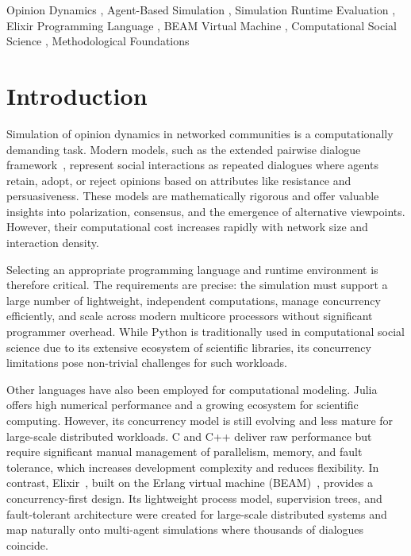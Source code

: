 \documentclass[
]{ceurart}
\begin{document}
\begin{keywords}
Opinion Dynamics \sep{} 
Agent-Based Simulation \sep{}
Simulation Runtime Evaluation \sep{} 
Elixir Programming Language \sep{} 
BEAM Virtual Machine \sep{} 
Computational Social Science \sep{} 
Methodological Foundations
\end{keywords}

\maketitle

\section{Introduction}
Simulation of opinion dynamics in networked communities is a computationally demanding task. Modern models, such as the extended pairwise dialogue framework~\cite{Lytvynenko2025}, represent social interactions as repeated dialogues where agents retain, adopt, or reject opinions based on attributes like resistance and persuasiveness. These models are mathematically rigorous and offer valuable insights into polarization, consensus, and the emergence of alternative viewpoints. However, their computational cost increases rapidly with network size and interaction density.

Selecting an appropriate programming language and runtime environment is therefore critical. The requirements are precise: the simulation must support a large number of lightweight, independent computations, manage concurrency efficiently, and scale across modern multicore processors without significant programmer overhead. While Python is traditionally used in computational social science due to its extensive ecosystem of scientific libraries, its concurrency limitations pose non-trivial challenges for such workloads.

Other languages have also been employed for computational modeling. Julia~\cite{Julia2025} offers high numerical performance and a growing ecosystem for scientific computing. However, its concurrency model is still evolving and less mature for large-scale distributed workloads. C and C++ deliver raw performance but require significant manual management of parallelism, memory, and fault tolerance, which increases development complexity and reduces flexibility. In contrast, Elixir~\cite{Elixir2025}, built on the Erlang virtual machine (BEAM)~\cite{Erlang2025}, provides a concurrency-first design. Its lightweight process model, supervision trees, and fault-tolerant architecture were created for large-scale distributed systems and map naturally onto multi-agent simulations where thousands of dialogues coincide.
\end{document}

